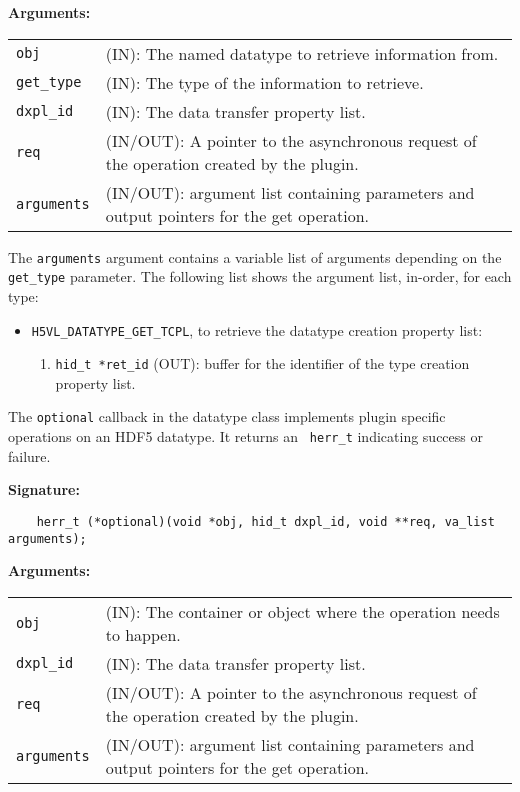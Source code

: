 \textbf{Arguments:}\\
\begin{tabular}{l p{10cm}}
  {\tt obj} & (IN): The named datatype to retrieve information from.\\
  {\tt get\_type} & (IN): The type of the information to retrieve.\\
  {\tt dxpl\_id} & (IN): The data transfer property list.\\
  {\tt req} & (IN/OUT): A pointer to the asynchronous request of the
  operation created by the plugin.\\
  {\tt arguments} & (IN/OUT): argument list containing parameters and
  output pointers for the get operation. \\
\end{tabular}

The {\tt arguments} argument contains a variable list of arguments
depending on the {\tt get\_type} parameter. The following list shows
the argument list, in-order, for each type:

\begin{itemize}
\item {\tt H5VL\_DATATYPE\_GET\_TCPL}, to retrieve the datatype
  creation property list:
  \begin{enumerate}
  \item {\tt hid\_t *ret\_id} (OUT): buffer for the identifier of the
    type creation property list.
  \end{enumerate}
\end{itemize}

The {\tt optional} callback in the datatype class implements plugin specific operations on an HDF5 datatype. It returns an {\tt
  herr\_t} indicating success or failure. 

\textbf{Signature:}
\begin{lstlisting}
    herr_t (*optional)(void *obj, hid_t dxpl_id, void **req, va_list arguments);
\end{lstlisting}

\textbf{Arguments:}\\
\begin{tabular}{l p{10cm}}
  {\tt obj} & (IN): The container or object where the operation needs to happen.\\
  {\tt dxpl\_id} & (IN): The data transfer property list.\\
  {\tt req} & (IN/OUT): A pointer to the asynchronous request of the operation created by the plugin.\\
  {\tt arguments} & (IN/OUT): argument list containing parameters and output pointers for the get operation. \\
\end{tabular}

